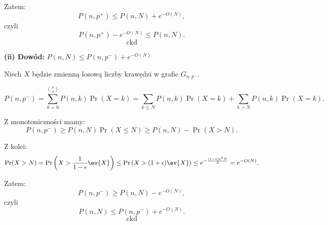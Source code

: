 Zatem:
\[
	P(n, p^{+}) \le P(n, N) + e^{-O(N)},
\]
czyli
\[
	P(n, p^{+}) - e^{-O(N)} \le P(n, N).
\]
\[
	\boxed{\text{ckd}}
\]

\bigskip

\textbf{(ii) Dowód:} \(P(n, N) \le P(n, p^{-}) + e^{-O(N)}\)

\medskip

Niech \(X\) będzie zmienną losową liczby krawędzi w grafie \(G_{n, p^{-}}\).

\[
	P(n, p^{-}) = \sum_{k=0}^{\binom{n}{2}} P(n, k)\Pr(X=k)
	= \sum_{k \le N} P(n, k)\Pr(X=k) + \sum_{k > N} P(n, k)\Pr(X=k).
\]

Z monotoniczności mamy:
\[
	P(n, p^{-}) \ge P(n, N)\Pr(X \le N) \ge P(n, N) - \Pr(X > N).
\]

Z kolei:
\[
	\Pr(X > N) = \Pr\left(X > \frac{1}{1-\epsilon}\ev{X}\right)
	\le \Pr\left(X > (1+\epsilon)\ev{X}\right)
	\le e^{-\frac{(1-\epsilon)\epsilon^2 N}{3}} = e^{-O(N)}.
\]

Zatem:
\[
	P(n, p^{-}) \ge P(n, N) - e^{-O(N)},
\]
czyli
\[
	P(n, N) \le P(n, p^{-}) + e^{-O(N)}.
\]
\[
	\boxed{\text{ckd}}
\]